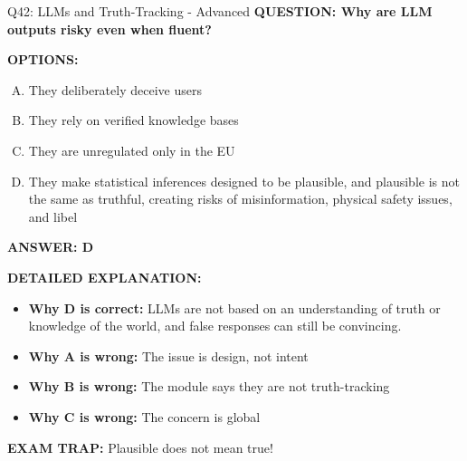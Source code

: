 \documentclass[8pt]{beamer}
\begin{document}
\begin{frame}[shrink=6]{Q42: LLMs and Truth-Tracking - Advanced}
\fontsize{6.5}{7.5}\selectfont
\textbf{QUESTION: Why are LLM outputs risky even when fluent?}

\vspace{0.1cm}
\textbf{OPTIONS:}
\begin{enumerate}[A.]
\item They deliberately deceive users
\item They rely on verified knowledge bases
\item They are unregulated only in the EU
\item They make statistical inferences designed to be plausible, and plausible is not the same as truthful, creating risks of misinformation, physical safety issues, and libel
\end{enumerate}

\vspace{0.1cm}
\textcolor{myblue}{\textbf{ANSWER: D}}

\vspace{0.1cm}
\textbf{DETAILED EXPLANATION:}
\begin{itemize}
\item \textbf{Why D is correct:} LLMs are not based on an understanding of truth or knowledge of the world, and false responses can still be convincing.
\item \textbf{Why A is wrong:} The issue is design, not intent
\item \textbf{Why B is wrong:} The module says they are not truth-tracking
\item \textbf{Why C is wrong:} The concern is global
\end{itemize}

\textcolor{myred}{\textbf{EXAM TRAP:}} Plausible does not mean true!
\end{frame}
\end{document}
